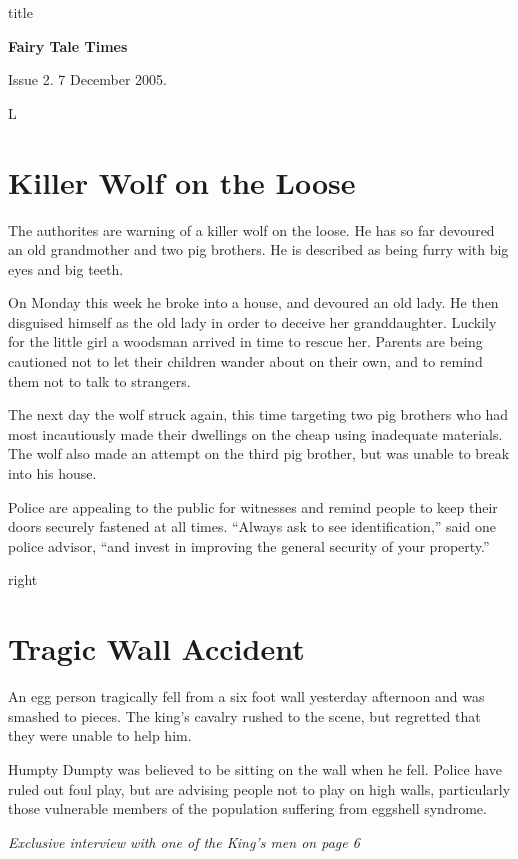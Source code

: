 \documentclass[12pt]{article}
\begin{document}
\begin{staticcontents*}{title}
\begin{center}
\bfseries\Huge
Fairy Tale Times
\end{center}
\hfill Issue 2. 7 December 2005.
\end{staticcontents*}

\begin{staticcontents*}{L}
\section{Killer Wolf on the Loose}

The authorites are warning of a killer wolf on the
loose. He has so far devoured an old grandmother and
two pig brothers. He is described as being furry with
big eyes and big teeth.

On Monday this week he broke into a house, and devoured
an old lady. He then disguised himself as the old lady
in order to deceive her granddaughter. Luckily for the little
girl a woodsman arrived in time to rescue her. Parents are
being cautioned not to let their children wander about on
their own, and to remind them not to talk to strangers.

The next day the wolf struck again, this time targeting two
pig brothers who had most incautiously made their dwellings
on the cheap using inadequate materials. The wolf also made
an attempt on the third pig brother, but was unable to break
into his house.

Police are appealing to the public for witnesses and remind
people to keep their doors securely fastened at all times.
``Always ask to see identification,'' said one police advisor,
``and invest in improving the general security of your property.''
\end{staticcontents*}

\begin{staticcontents*}{right}
\section{Tragic Wall Accident}

An egg person tragically fell from a six foot wall yesterday
afternoon and was smash\-ed to pieces. The king's cavalry rushed
to the scene, but regretted that they  were unable to help him.

Humpty Dumpty was believed to be sitting on the wall when he fell. Police have ruled out foul play, but
are advising people not to play on high walls, particularly
those vulnerable members of the population suffering from
eggshell syndrome.

\small\em
Exclusive interview with one of the King's men on page 6
\end{staticcontents*}
\end{document}
